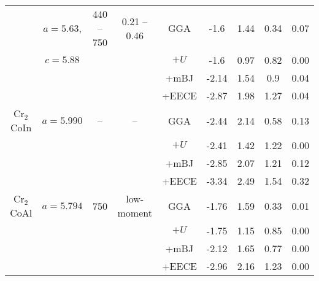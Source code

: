 \documentclass[preprint,5p]{elsarticle}
\begin{document}
\begin{table*}
\begin{tabular}{ccccccccc}
&$a=5.63$, &440 -- 750&0.21 -- 0.46&GGA&-1.6&1.44&0.34&0.07 \\
&$c=5.88$\cite{jamer16}&&&$+U$&-1.6&0.97&0.82&0.00 \\
&&&&+mBJ&-2.14&1.54&0.9&0.04 \\
&&&&+EECE&-2.87&1.98&1.27&0.04 \\ \hline

Cr$_2$CoIn&$a=5.990$  &--&--&GGA&-2.44&2.14&0.58&0.13 \\
&&&&$+U$&-2.41&1.42&1.22&0.00 \\
&&&&+mBJ&-2.85&2.07&1.21&0.12 \\
&&&&+EECE&-3.34&2.49&1.54&0.32 \\\hline

Cr$_2$CoAl&$a=5.794$\cite{cca_exp}&750&low-moment&GGA&-1.76&1.59&0.33&0.01 \\
&&&&$+U$&-1.75&1.15&0.85&0.00 \\
&&&&+mBJ&-2.12&1.65&0.77&0.00 \\
&&&&+EECE&-2.96&2.16&1.23&0.00 \\
\hline\hline

\end{tabular}
\label{table1}
\end{table*}
\end{document}
